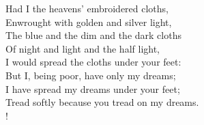 \begin{singlepoem}
	\begin{altverse}\xstanza
	Had I the heavens' embroidered cloths,			\\
	Enwrought with golden and silver light,			\\
	The blue and the dim and the dark cloths		\\
	Of night and light and the half light,			\\
	I would spread the cloths under your feet:		\\
	But I, being poor, have only my dreams;			\\
	I have spread my dreams under your feet;		\\
	Tread softly because you tread on my dreams.	\\!
	\end{altverse}
\end{singlepoem}









